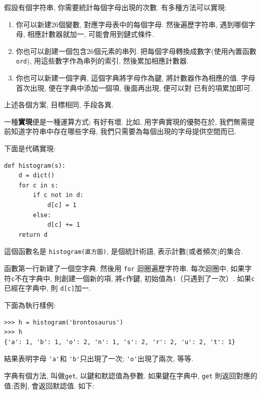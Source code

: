 \documentclass[10pt]{book}
\begin{document}
假設有個字符串, 你需要統計每個字母出現的次數. 
有多種方法可以實現:

\begin{enumerate}

\item 你可以新建26個變數, 對應字母表中的每個字母. 
然後遍歷字符串, 遇到哪個字母, 相應計數器就加一, 
可能會用到鏈式條件. 

\item 你也可以創建一個包含26個元素的串列. 
把每個字母轉換成數字(使用內置函數{\tt ord}), 用這些數字作為串列的索引, 
然後累加相應計數器. 

\item 你也可以新建一個字典, 這個字典將字母作為鍵, 
將計數器作為相應的值. 
字母首次出現, 便在字典中添加一個項, 後面再出現, 便可以對
已有的項累加即可. 

\end{enumerate}

上述各個方案, 目標相同, 手段各異.

一種{\bf 實現}便是一種運算方式; 有好有壞. 
比如, 用字典實現的優勢在於, 我們無需提前知道字符串中存在哪些字母, 
我們只需要為每個出現的字母提供空間而已. 

下面是代碼實現:

\begin{verbatim}
def histogram(s):
    d = dict()
    for c in s:
        if c not in d:
            d[c] = 1
        else:
            d[c] += 1
    return d
\end{verbatim}
%
這個函數名是 {\tt histogram(直方圖)}, 是個統計術語, 表示計數(或者頻次)的集合.

函數第一行新建了一個空字典. 
然後用 {\tt for} 迴圈遍歷字符串. 每次迴圈中, 如果字符{\tt c}不在字典中, 
則創建一個新的項, 將{\tt c}作鍵, 初始值為1（只遇到了一次）. 
如果{\tt c} 已經在字典中, 則 {\tt d[c]}加一.

下面為執行樣例:

\begin{verbatim}
>>> h = histogram('brontosaurus')
>>> h
{'a': 1, 'b': 1, 'o': 2, 'n': 1, 's': 2, 'r': 2, 'u': 2, 't': 1}
\end{verbatim}
%

結果表明字母 \verb"'a'"和 \verb"'b'"只出現了一次;
\verb"'o'"出現了兩次, 等等. 


字典有個方法, 叫做{\tt get}, 
以鍵和默認值為參數. 
如果鍵在字典中, {\tt get} 則返回對應的值;否則, 會返回默認值. 
如下:
\end{document}
